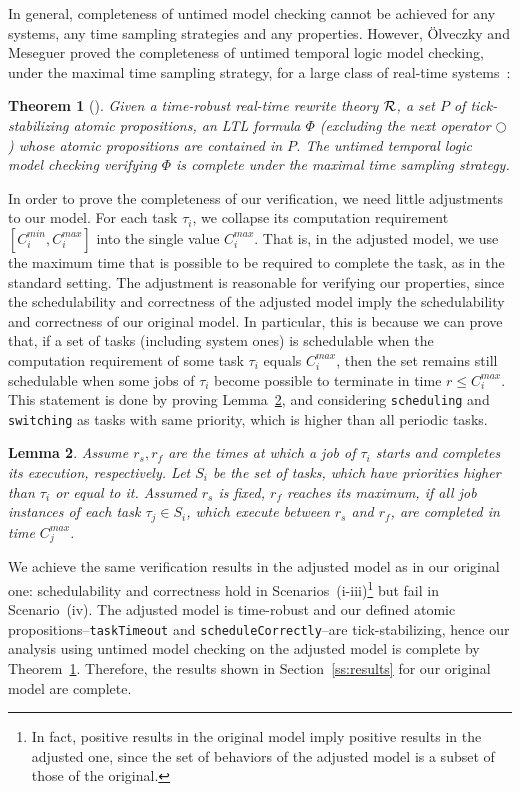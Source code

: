 \documentclass[10pt,journal,compsoc]{IEEEtran}
\newtheorem{theorem}{Theorem}
\newtheorem{lemma}[theorem]{Lemma}
\begin{document}
In general, completeness of untimed model checking cannot be achieved
for any systems, any time sampling strategies and any
properties. However, \"Olveczky and Meseguer proved the completeness
of untimed temporal logic model checking, under the maximal time
sampling strategy, for a large class of real-time
systems~\cite{DBLP:journals/entcs/OlveczkyM07a}:
\begin{theorem}[\cite{DBLP:journals/entcs/OlveczkyM07a}]
\label{t:completeness}
Given a \emph{time-robust} real-time rewrite theory $\cal R$, a set
$P$ of \emph{tick-stabilizing} atomic propositions, an LTL formula
$\Phi$ (excluding the \emph{next} operator $\bigcirc$) whose atomic
propositions are contained in $P$. The untimed temporal logic model
checking verifying $\Phi$ is \emph{complete} under the maximal time
sampling strategy.
\end{theorem}

In order to prove the completeness of our verification, we need little
adjustments to our model.  For each task $\tau_i$, we collapse its
computation requirement $[C_i^{min},C_i^{max}]$ into the single value
$C_i^{max}$.  That is, in the adjusted model, we use the maximum time
that is possible to be required to complete the task, as in the
standard setting. The adjustment is reasonable for verifying our
properties, since the schedulability and correctness of the adjusted
model imply the schedulability and correctness of our original
model. In particular, this is because we can prove that, if a set of
tasks (including system ones) is schedulable when the computation
requirement of some task $\tau_i$ equals $C_i^{max}$, then the set
remains still schedulable when some jobs of $\tau_i$ become possible
to terminate in time $r\le C_i^{max}$. This statement is done by
proving Lemma~\ref{l:max}, and considering \verb|scheduling| and
\verb|switching| as tasks with same priority, which is higher than all
periodic tasks.
\begin{lemma}
\label{l:max}
Assume $r_s, r_f$ are the times at which a job of $\tau_i$ starts and
completes its execution, respectively. Let $S_i$ be the set of tasks,
which have priorities higher than $\tau_i$ or equal to it. Assumed
$r_s$ is fixed, $r_f$ reaches its maximum, if all job instances of
each task $\tau_j\in S_i$, which execute between $r_s$ and $r_f$, are
completed in time $C_j^{max}$.
\end{lemma}

We achieve the same verification results in the adjusted model as in
our original one: schedulability and correctness hold in
Scenarios~(i-iii)\footnote{In fact, positive results in the original
  model imply positive results in the adjusted one, since the set of
  behaviors of the adjusted model is a subset of those of the
  original.} but fail in Scenario~(iv).  The adjusted model is
time-robust and our defined atomic propositions--\verb|taskTimeout|
and \verb|scheduleCorrectly|--are tick-stabilizing, hence our analysis
using untimed model checking on the adjusted model is complete by
Theorem~\ref{t:completeness}. Therefore, the results shown in
Section~\ref{ss:results} for our original model are complete.
\end{document}
